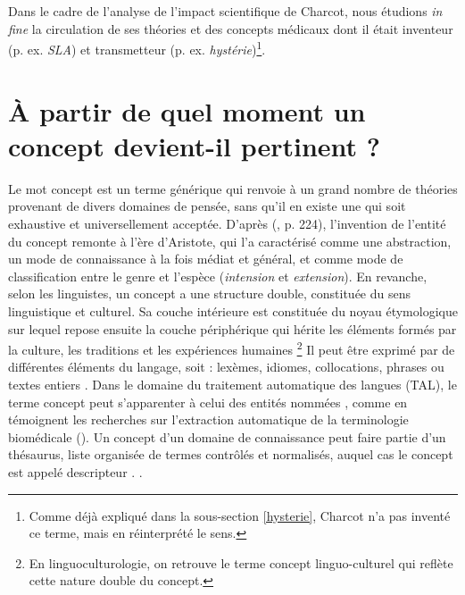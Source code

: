 Dans le cadre de l'analyse de l'impact scientifique de Charcot, nous étudions \textit{in fine} la circulation de ses théories et des concepts médicaux dont il était inventeur (p. ex. \textit{SLA}) et transmetteur (p. ex. \textit{hystérie})\footnote{Comme déjà expliqué dans la sous-section \ref{hysterie}, Charcot n'a pas inventé ce terme, mais en réinterprété le sens.}. 

\section{À partir de quel moment un concept devient-il pertinent ?}
\label{concept}

Le mot \og{}concept\fg{} est un terme générique qui renvoie à un grand nombre de théories provenant de divers domaines de pensée, sans qu'il en existe une qui soit exhaustive et universellement acceptée. D'après \citeauthor{Lecourt1999} (\citeyear{Lecourt1999}, p. 224), l'invention de l'entité du concept remonte à l'ère d'Aristote, qui l'a caractérisé comme une abstraction, un mode de connaissance à la fois médiat et général, et comme mode de classification entre le genre et l'espèce (\textit{intension} et \textit{extension}). En revanche, selon les linguistes, un concept a une structure double, constituée du sens linguistique et culturel.
Sa couche intérieure est constituée du noyau étymologique sur lequel repose ensuite la couche périphérique qui hérite les éléments formés par la culture, les traditions et les expériences humaines 
\footnote{En linguoculturologie, on retrouve le terme \og{}concept linguo-culturel\fg{} qui reflète cette nature double du concept.} Il peut être exprimé par de différentes éléments du langage, soit : lexèmes, idiomes, collocations, phrases ou textes entiers \citep[p.~5]{nemickiene2011concept}.  Dans le domaine du traitement automatique des langues (\textsc{TAL}), le terme \og concept \fg{} peut s'apparenter à celui des \og entités nommées \fg{}, comme en témoignent les recherches sur l'extraction automatique de la terminologie biomédicale (\citealp{jolly2024exploring,navarro2023clinical}). Un concept d'un domaine de connaissance peut faire partie d'un thésaurus, liste organisée de termes contrôlés et normalisés, auquel cas le concept est appelé \og descripteur \fg{}. \citep[p.~16]{RENNESSON202015}.



